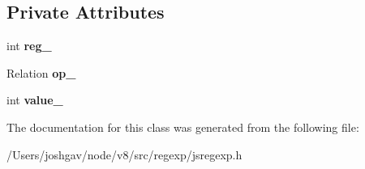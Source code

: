 \subsection*{Private Attributes}
\begin{DoxyCompactItemize}
\item 
int {\bfseries reg\+\_\+}\hypertarget{classv8_1_1internal_1_1_guard_ac1276bd90cc3df2e2be1d9a9faea010a}{}\label{classv8_1_1internal_1_1_guard_ac1276bd90cc3df2e2be1d9a9faea010a}

\item 
Relation {\bfseries op\+\_\+}\hypertarget{classv8_1_1internal_1_1_guard_a4059b49b95669b11128aae62464f03e0}{}\label{classv8_1_1internal_1_1_guard_a4059b49b95669b11128aae62464f03e0}

\item 
int {\bfseries value\+\_\+}\hypertarget{classv8_1_1internal_1_1_guard_a3b329ad5f880edee782905dcf052ef99}{}\label{classv8_1_1internal_1_1_guard_a3b329ad5f880edee782905dcf052ef99}

\end{DoxyCompactItemize}


The documentation for this class was generated from the following file\+:\begin{DoxyCompactItemize}
\item 
/\+Users/joshgav/node/v8/src/regexp/jsregexp.\+h\end{DoxyCompactItemize}
